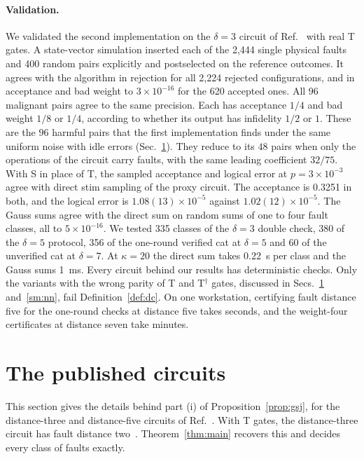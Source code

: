 \documentclass[aps,prl,reprint,twocolumn,amsmath,amssymb,floatfix,nofootinbib,superscriptaddress]{revtex4-2}
\theoremstyle{definition}
\theoremstyle{remark}
\begin{document}
\paragraph*{Validation.}
We validated the second implementation on the $\delta=3$ circuit of Ref.~\cite{cultivation} with real T gates. A state-vector simulation inserted each of the 2,444 single physical faults and 400 random pairs explicitly and postselected on the reference outcomes. It agrees with the algorithm in rejection for all 2,224 rejected configurations, and in acceptance and bad weight to $3\times10^{-16}$ for the 620 accepted ones. All 96 malignant pairs agree to the same precision. Each has acceptance $1/4$ and bad weight $1/8$ or $1/4$, according to whether its output has infidelity $1/2$ or $1$. These are the $96$ harmful pairs that the first implementation finds under the same uniform noise with idle errors (Sec.~\ref{sm:gsj}). They reduce to its $48$ pairs when only the operations of the circuit carry faults, with the same leading coefficient $32/75$. With S in place of T, the sampled acceptance and logical error at $p=3\times10^{-3}$ agree with direct stim sampling of the proxy circuit. The acceptance is 0.3251 in both, and the logical error is $1.08(13)\times10^{-5}$ against $1.02(12)\times10^{-5}$. The Gauss sums agree with the direct sum on random sums of one to four fault classes, all to $5\times10^{-16}$. We tested 335 classes of the $\delta=3$ double check, 380 of the $\delta=5$ protocol, 356 of the one-round verified cat at $\delta=5$ and 60 of the unverified cat at $\delta=7$. At $\kappa=20$ the direct sum takes 0.22~s per class and the Gauss sums 1~ms. Every circuit behind our results has deterministic checks. Only the variants with the wrong parity of T and T$^\dagger$ gates, discussed in Secs.~\ref{sm:gsj} and~\ref{sm:nn}, fail Definition~\ref{def:dc}. On one workstation, certifying fault distance five for the one-round checks at distance five takes seconds, and the weight-four certificates at distance seven take minutes.

\section{The published circuits}\label{sm:gsj}
This section gives the details behind part (i) of Proposition~\ref{prop:gsj}, for the distance-three and distance-five circuits of Ref.~\cite{cultivation}. With T gates, the distance-three circuit has fault distance two~\cite{chan,wanzapirain}. Theorem~\ref{thm:main} recovers this and decides every class of faults exactly.
\end{document}
